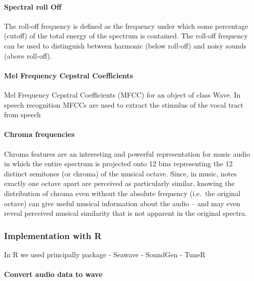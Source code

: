 \documentclass[]{article}
\let\oldparagraph\paragraph
\renewcommand{\paragraph}[1]{\oldparagraph{#1}\mbox{}}
\begin{document}
\paragraph{Spectral roll Off}\label{spectral-roll-off}

The roll-off frequency is defined as the frequency under which some
percentage (cutoff) of the total energy of the spectrum is contained.
The roll-off frequency can be used to distinguish between harmonic
(below roll-off) and noisy sounds (above roll-off).

\paragraph{Mel Frequency Cepstral
Coefficients}\label{mel-frequency-cepstral-coefficients}

Mel Frequency Cepstral Coefficients (MFCC) for an object of class Wave.
In speech recognition MFCCs are used to extract the stimulus of the
vocal tract from speech

\paragraph{Chroma frequencies}\label{chroma-frequencies}

Chroma features are an interesting and powerful representation for music
audio in which the entire spectrum is projected onto 12 bins
representing the 12 distinct semitones (or chroma) of the musical
octave. Since, in music, notes exactly one octave apart are perceived as
particularly similar, knowing the distribution of chroma even without
the absolute frequency (i.e.~the original octave) can give useful
musical information about the audio -- and may even reveal perceived
musical similarity that is not apparent in the original spectra.

\subsubsection{Implementation with R}\label{implementation-with-r}

In R we used principally package - Seawave - SoundGen - TuneR

\paragraph{Convert audio data to wave}\label{convert-audio-data-to-wave}
\end{document}
